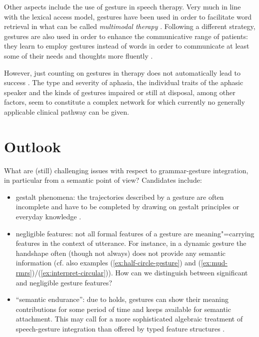 \documentclass[output=paper]{langsci/langscibook}
\begin{document}
Other aspects include the use of gesture in speech therapy. 
%
Very much in line with the lexical access model, gestures have been used in order to facilitate word retrieval in what can be called \emph{multimodal therapy}  \citep{Rose:2006}.
%
Following a different strategy, gestures are also used in order to enhance the communicative range of patients: they learn to employ gestures instead of words in order to communicate at least some of their needs and thoughts more fluently \citep{Cubelli:Trentini:Montagna:1991,Caute:et:al:2013}.

However, just counting on gestures in therapy does not automatically lead to success \citep{Auer:Bauer:2011}. 
%
The type and severity of aphasia, the individual traits of the aphasic speaker and the kinds of gestures impaired or still at disposal, among other factors, seem to constitute a complex network for which currently no generally applicable clinical pathway can be given.




\section{Outlook}
\label{sec:outlook}

What are (still) challenging issues with respect to grammar-gesture integration, in particular from a semantic point of view? Candidates include:

\begin{itemize}
\item gestalt phenomena: the trajectories described by a gesture are often incomplete and have to be completed by drawing on gestalt principles or everyday knowledge \citep{Luecking:2016}.
\item negligible features: not all formal features of a gesture are meaning"=carrying features in the context of utterance. For instance, in a dynamic gesture the handshape often (though not always) does not provide any semantic information (cf. also examples (\ref{ex:half-circle-gesture}) and (\ref{ex:mud-rmrs})/(\ref{ex:interpret-circular})). How can we distinguish between significant and negligible gesture features?
\item \enquote{semantic endurance}: due to holds, gestures can show their meaning contributions for some period of time and keeps available for semantic attachment. This may call for a more sophisticated algebraic treatment of speech-gesture integration than offered by typed feature structures \citep{Rieser:2015}.
\end{itemize}
\end{document}

